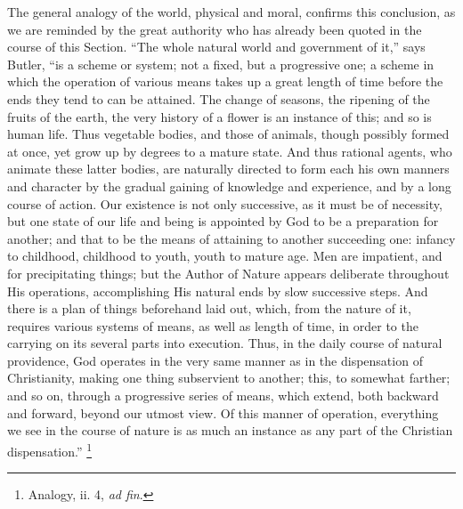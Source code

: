 The general analogy of the world, physical and moral,
confirms this conclusion, as we are reminded by the great
authority who has already been quoted in the course of
this Section. ``The whole natural world and
government of it,'' says Butler, ``is a scheme or
system; not a fixed, but a progressive one; a scheme in
which the operation of various means takes up a great
length of time before the ends they tend to can be
attained. The change of seasons, the ripening of the
fruits of the earth, the very history of a flower is an
instance of this; and so is human life. Thus vegetable
bodies, and those of animals, though possibly formed at
once, yet grow up by degrees to a mature state. And thus
rational agents, who animate these latter bodies, are
naturally directed to form each his own manners and
character by the gradual gaining of knowledge and
experience, and by a long course of action. Our existence
is not only successive, as it must be of necessity, but
one state of our life and being is appointed by God to be
a preparation for another; and that to be the means of
attaining to another succeeding one: infancy to
childhood, childhood to youth, youth to mature age. Men
are impatient, and for precipitating things; but the
Author of Nature appears deliberate throughout His
operations, accomplishing His natural ends by slow
successive steps. And there is a plan of things
beforehand laid out, which, from the nature of it,
requires various systems of means, as well as length of
time, in order to the carrying on its several parts into
execution. Thus, in the daily course of natural
providence, God operates in the very same manner as in
the dispensation of Christianity, making one thing
subservient to another; this, to somewhat farther; and so
on, through a progressive series of means, which extend,
both backward and forward, beyond our utmost view. Of
this manner of operation, everything we see in the course
of nature is as much an instance as any part of the
Christian dispensation.'' \footnote{Analogy, ii. 4, \emph{ad fin}.}


